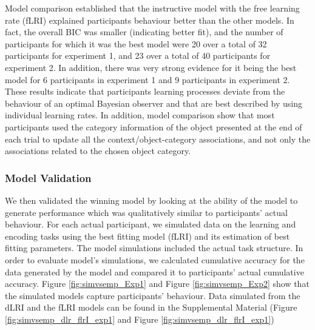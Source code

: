 \documentclass[a4paper,12pt]{article}
\begin{document}
Model comparison established that the instructive model with the free learning rate (fLRI) explained participants behaviour better than the other models. In fact, the overall BIC was smaller (indicating better fit), and the number of participants for which it was the best model were 20 over a total of 32 participants for experiment 1, and 23 over a total of 40 participants for experiment 2. In addition, there was very strong evidence for it being the best model for 6 participants in experiment 1 and 9 participants in experiment 2. %
These results indicate that participants learning processes deviate from the behaviour of an optimal Bayesian observer and that are best described by using individual learning rates. In addition, model comparison show that most participants used the category information of the object presented at the end of each trial to update all the context/object-category associations, and not only the associations related to the chosen object category.

\subsubsection{Model Validation}
We then validated the winning model by looking at the ability of the model to generate performance which was qualitatively similar to participants' actual behaviour. For each actual participant, we simulated data on the learning and encoding tasks using the best fitting model (fLRI) and its estimation of best fitting parameters. The model simulations included the actual task structure. In order to evaluate model's simulations, we calculated cumulative accuracy for the data generated by the model and compared it to participants' actual cumulative accuracy. Figure \ref{fig:simvsemp_Exp1} and Figure \ref{fig:simvsemp_Exp2} show that the simulated models capture participants' behaviour. Data simulated from the dLRI and the fLRI models can be found in the Supplemental Material (Figure \ref{fig:simvsemp_dlr_flrI_exp1} and Figure \ref{fig:simvsemp_dlr_flrI_exp1})
\end{document}
